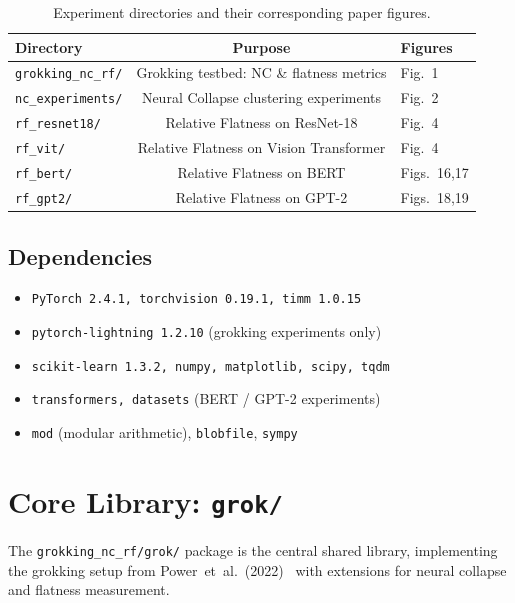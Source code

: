 \documentclass[11pt,a4paper]{article}
\theoremstyle{definition}
\begin{document}
\begin{table}[h]
\centering
\small
\begin{tabular}{lcl}
\toprule
\textbf{Directory} & \textbf{Purpose} & \textbf{Figures} \\
\midrule
\texttt{grokking\_nc\_rf/} & Grokking testbed: NC \& flatness metrics & Fig.~1 \\
\texttt{nc\_experiments/}   & Neural Collapse clustering experiments  & Fig.~2 \\
\texttt{rf\_resnet18/}      & Relative Flatness on ResNet-18          & Fig.~4 \\
\texttt{rf\_vit/}           & Relative Flatness on Vision Transformer & Fig.~4 \\
\texttt{rf\_bert/}          & Relative Flatness on BERT               & Figs.~16,17 \\
\texttt{rf\_gpt2/}          & Relative Flatness on GPT-2              & Figs.~18,19 \\
\bottomrule
\end{tabular}
\caption{Experiment directories and their corresponding paper figures.}
\label{tab:dirs}
\end{table}

\subsection*{Dependencies}

\begin{itemize}[leftmargin=*]
    \item \texttt{PyTorch 2.4.1, torchvision 0.19.1, timm 1.0.15}
    \item \texttt{pytorch-lightning 1.2.10} (grokking experiments only)
    \item \texttt{scikit-learn 1.3.2, numpy, matplotlib, scipy, tqdm}
    \item \texttt{transformers, datasets} (BERT / GPT-2 experiments)
    \item \texttt{mod} (modular arithmetic), \texttt{blobfile}, \texttt{sympy}
\end{itemize}

\section{Core Library: \texttt{grok/}}

The \texttt{grokking\_nc\_rf/grok/} package is the central shared library, implementing
the grokking setup from Power~et~al.~(2022)~\cite{power2022grokking} with extensions for
neural collapse and flatness measurement.
\end{document}
